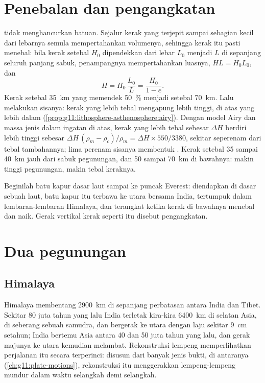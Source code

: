 \section{Penebalan dan pengangkatan}

 tidak menghancurkan batuan. Sejalur kerak yang terjepit sampai
sebagian kecil dari lebarnya semula mempertahankan volumenya, sehingga kerak itu
pasti menebal: bila kerak setebal
$H_0$ dipendekkan dari lebar $L_0$ menjadi $L$ di sepanjang seluruh panjang
sabuk, penampangnya mempertahankan luasnya, $H L = H_0 L_0$, dan
\[
  H = H_0\,\frac{L_0}{L} = \frac{H_0}{1 - e}.
\]
Kerak setebal \qty{35}{km} yang memendek \qty{50}{\percent} menjadi setebal
\qty{70}{km}. Lalu  melakukan sisanya: kerak yang lebih tebal mengapung
lebih tinggi, di atas  yang lebih dalam (\cref{prop:g11:lithosphere-asthenosphere:airy}).
Dengan model Airy dan massa jenis dalam ingatan di atas, kerak yang lebih tebal
sebesar $\Delta H$ berdiri lebih tinggi sebesar $\Delta H\,(\rho_m - \rho_c)/\rho_m = \Delta H
\times 550/3380$, sekitar seperenam dari tebal tambahannya; lima perenam
sisanya membentuk . Kerak setebal \num{35} sampai \qty{40}{km} jauh dari
sabuk pegunungan, dan 50 sampai \qty{70}{km} di bawahnya: makin tinggi
pegunungan, makin tebal keraknya.

Beginilah batu kapur dasar laut sampai ke puncak Everest: diendapkan di dasar
sebuah laut, batu kapur itu terbawa ke utara bersama India, tertumpuk dalam
lembaran-lembaran  Himalaya, dan terangkat ketika kerak di bawahnya
menebal dan naik. Gerak vertikal kerak seperti itu disebut pengangkatan.

\section{Dua pegunungan}

\subsection{Himalaya}

Himalaya membentang \qty{2900}{km} di sepanjang perbatasan antara India dan
Tibet. Sekitar 80 juta tahun yang lalu India terletak kira-kira \qty{6400}{km}
di selatan Asia, di seberang sebuah samudra, dan bergerak ke utara dengan laju
sekitar \qty{9}{cm} setahun; India bertemu Asia antara 40 dan 50 juta tahun
yang lalu, dan gerak majunya ke utara kemudian melambat. Rekonstruksi lempeng
memperlihatkan perjalanan itu secara terperinci: disusun dari banyak jenis
bukti, di antaranya  (\cref{ch:g11:plate-motions}),
rekonstruksi itu menggerakkan lempeng-lempeng mundur dalam waktu selangkah demi
selangkah.

